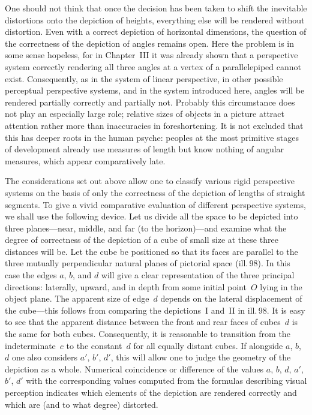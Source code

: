 One should not think that once the decision has been taken to shift the inevitable
distortions onto the depiction of heights, everything else will be rendered without
distortion. Even with a correct depiction of horizontal dimensions, the question of
the correctness of the depiction of angles remains open. Here the problem is in some
sense hopeless, for in Chapter~III it was already shown that a perspective system
correctly rendering all three angles at a vertex of a parallelepiped cannot exist.
Consequently, as in the system of linear perspective, in other possible perceptual
perspective systems, and in the system introduced here, angles will be rendered
partially correctly and partially not. Probably this circumstance does not play an
especially large role; relative sizes of objects in a picture attract attention
rather more than inaccuracies in foreshortening. It is not excluded that this has
deeper roots in the human psyche: peoples at the most primitive stages of development
already use measures of length but know nothing of angular measures, which appear
comparatively late.


The considerations set out above allow one to classify various rigid perspective
systems on the basis of only the correctness of the depiction of lengths of straight
segments. To give a vivid comparative evaluation of different perspective systems,
we shall use the following device. Let us divide all the space to be depicted into
three planes---near, middle, and far (to the horizon)---and examine what the degree
of correctness of the depiction of a cube of small size at these three distances
will be. Let the cube be positioned so that its faces are parallel to the three
mutually perpendicular natural planes of pictorial space (ill.\,98). In this case
the edges $a$, $b$, and $d$ will give a clear representation of the three principal
directions: laterally, upward, and in depth from some initial point~$O$ lying in the
object plane. The apparent size of edge~$d$ depends on the lateral displacement of
the cube---this follows from comparing the depictions~I and~II in ill.\,98. It is
easy to see that the apparent distance between the front and rear faces of cubes~$d$
is the same for both cubes. Consequently, it is reasonable to transition from the
indeterminate~$c$ to the constant~$d$ for all equally distant cubes. If alongside
$a$, $b$, $d$ one also considers $a'$, $b'$, $d'$, this will allow one to judge the
geometry of the depiction as a whole. Numerical coincidence or difference of the
values $a$, $b$, $d$, $a'$, $b'$, $d'$ with the corresponding values computed from
the formulas describing visual perception indicates which elements of the depiction
are rendered correctly and which are (and to what degree) distorted.

